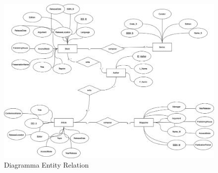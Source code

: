 \newpage
\begin{landscape}
\begin{figure}[hbt]
\centering
\includegraphics[width=1.5\textwidth]{Immagini/DiagrammaER.png}
\caption{Diagramma Entity Relation}
\end{figure}
\end{landscape}


